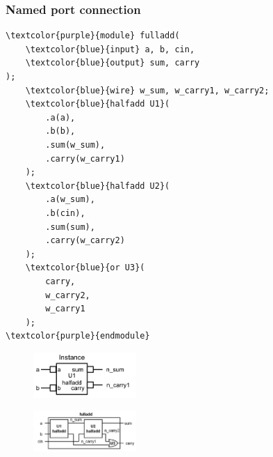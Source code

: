 \documentclass[t]{beamer}
\begin{document}
\begin{frame}[fragile]
\frametitle{Named port connection}
\begin{multicols}{2}
{\scriptsize%
\begin{Verbatim}[commandchars=\\\{\}, tabsize=2]
\textcolor{purple}{module} fulladd(
    \textcolor{blue}{input} a, b, cin,
    \textcolor{blue}{output} sum, carry
);
    \textcolor{blue}{wire} w_sum, w_carry1, w_carry2;
    \textcolor{blue}{halfadd U1}(
        .a(a),
        .b(b),
        .sum(w_sum),
        .carry(w_carry1)
    );
    \textcolor{blue}{halfadd U2}(
        .a(w_sum),
        .b(cin),
        .sum(sum),
        .carry(w_carry2)
    );
    \textcolor{blue}{or U3}(
        carry, 
        w_carry2,
        w_carry1
    );
\textcolor{purple}{endmodule}
\end{Verbatim}
}
\columnbreak
\begin{figure}[H!]
	\includegraphics[width=0.35\textwidth]{img/03_inst.png}
\end{figure}
\begin{figure}[H!]
    \includegraphics[width=0.35\textwidth]{img/03_fulladd.png}
\end{figure}
\end{multicols}
\end{frame}
\end{document}
